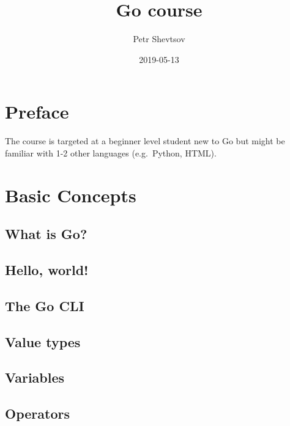 \documentclass[]{book}
\title{Go course}
\author{Petr Shevtsov}
\date{2019-05-13}
\begin{document}
\maketitle

{
\setcounter{tocdepth}{1}
\tableofcontents
}
\hypertarget{preface}{%
\chapter*{Preface}\label{preface}}

The course is targeted at a beginner level student new to Go but might be
familiar with 1-2 other languages (e.g.~Python, HTML).

\hypertarget{basic-concepts}{%
\chapter{Basic Concepts}\label{basic-concepts}}

\hypertarget{what-is-go}{%
\section{What is Go?}\label{what-is-go}}

\hypertarget{hello-world}{%
\section{Hello, world!}\label{hello-world}}

\hypertarget{the-go-cli}{%
\section{The Go CLI}\label{the-go-cli}}

\hypertarget{value-types}{%
\section{Value types}\label{value-types}}

\hypertarget{variables}{%
\section{Variables}\label{variables}}

\hypertarget{operators}{%
\section{Operators}\label{operators}}
\end{document}
